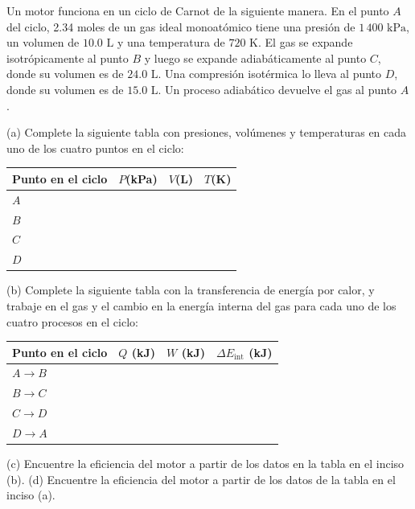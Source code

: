 \item Un motor funciona en un ciclo de Carnot de la siguiente manera. En el punto $A$ del ciclo, 2.34 moles de un gas ideal monoatómico tiene una presión de $1\,400\text{ kPa}$, un volumen de $10.0\text{ L}$ y una temperatura de $720\text{ K}$. El gas se expande isotrópicamente al punto $B$ y luego se expande adiabáticamente al punto $C$, donde su volumen es de $24.0\text{ L}$. Una compresión isotérmica lo lleva al punto $D$, donde su volumen es de $15.0\text{ L}$. Un proceso adiabático devuelve el gas al punto $A$. 
    
(a) Complete la siguiente tabla con presiones, volúmenes y temperaturas en cada uno de los cuatro puntos en el ciclo:

\begin{center}
\begin{tabular}{lccc}
\hline
\textbf{Punto en el ciclo} & \textbf{$P$(kPa)} & \textbf{$V$(L)} & \textbf{$T$(K)} \\
\hline
$A$ & & & \\
$B$ & & & \\
$C$ & & & \\
$D$ & & & \\
\hline
\end{tabular}
\end{center}

(b) Complete la siguiente tabla con la transferencia de energía por calor, y trabaje en el gas y el cambio en la energía interna del gas para cada uno de los cuatro procesos en el ciclo:

\begin{center}
\begin{tabular}{lccc}
\hline
\textbf{Punto en el ciclo} & \textbf{$Q$ (kJ)} & \textbf{$W$ (kJ)} & \textbf{$\Delta E_{\text{int}}$ (kJ)} \\
\hline
$A \rightarrow B$ & & & \\
$B \rightarrow C$ & & & \\
$C \rightarrow D$ & & & \\
$D \rightarrow A$ & & & \\
\hline
\end{tabular}
\end{center}

(c) Encuentre la eficiencia del motor a partir de los datos en la tabla en el inciso (b). 
(d) Encuentre la eficiencia del motor a partir de los datos de la tabla en el inciso (a).
